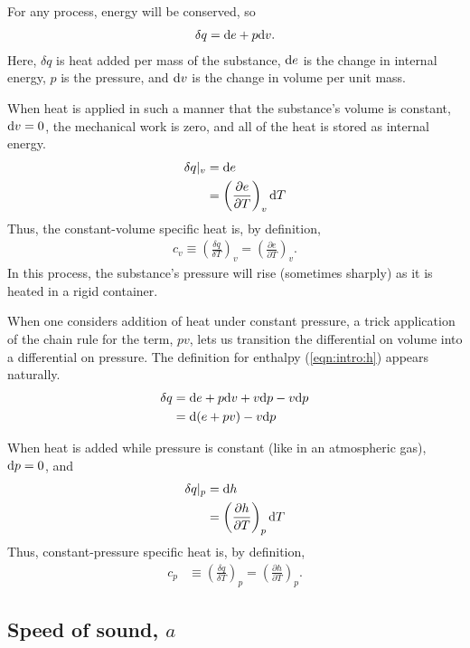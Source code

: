 For any process, energy will be conserved, so
\begin{align}
\delta q = \mathrm{d} e + p\mathrm{d} v.\label{eqn:intro:1stlaw}
\end{align}
Here, $\delta q$ is heat added per mass of the substance, $\mathrm{d} e$ is the change in internal energy, $p$ is the pressure, and $\mathrm{d} v$ is the change in volume per unit mass.

When heat is applied in such a manner that the substance's volume is constant, $\mathrm{d} v = 0$, the mechanical work is zero, and all of the heat is stored as internal energy.
\begin{align}
\delta q |_v &= \mathrm{d} e\nonumber\\
 &= \left(\frac{\partial e}{\partial T}\right)_v \mathrm{d} T
\end{align}
Thus, the constant-volume specific heat is, by definition, 
\begin{align}
c_v \equiv \left(\frac{\delta q}{\delta T}\right)_v = \left(\frac{\partial e}{\partial T}\right)_v.\label{eqn:intro:cv}
\end{align}
In this process, the substance's pressure will rise (sometimes sharply) as it is heated in a rigid container.

When one considers addition of heat under constant pressure, a trick application of the chain rule for the term, $pv$, lets us transition the differential on volume into a differential on pressure.  The definition for enthalpy (\ref{eqn:intro:h}) appears naturally.
\begin{align}
\delta q &= \mathrm{d} e + p \mathrm{d} v + v\mathrm{d} p - v \mathrm{d} p\nonumber\\
 &= \mathrm{d}(e + pv) - v\mathrm{d} p
\end{align}

When heat is added while pressure is constant (like in an atmospheric gas), $\mathrm{d} p=0$, and 
\begin{align}
\delta q |_p &= \mathrm{d} h\nonumber\\
 &= \left( \frac{\partial h}{\partial T}\right)_p \mathrm{d} T
\end{align}
Thus, constant-pressure specific heat is, by definition,
\begin{align}
c_p &\equiv \left(\frac{\delta q}{\delta T}\right)_p = \left( \frac{\partial h}{\partial T}\right)_p.\label{eqn:intro:cp}
\end{align}


\subsection{Speed of sound, $a$}\label{sec:intro:a}

